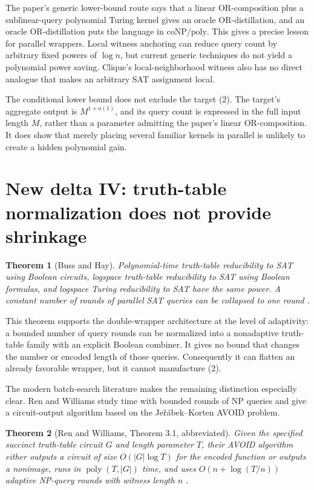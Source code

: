 \documentclass[11pt]{article}
\newtheorem{theorem}{Theorem}
\newcommand{\poly}{\operatorname{poly}}
\begin{document}
The paper's generic lower-bound route says that a linear OR-composition plus
a sublinear-query polynomial Turing kernel gives an oracle
OR-distillation, and an oracle OR-distillation puts the language in
$\mathrm{coNP/poly}$.  This gives a precise lesson for parallel wrappers.
Local witness anchoring can reduce query count by arbitrary fixed powers of
$\log n$, but current generic techniques do not yield a polynomial power
saving.  Clique's local-neighborhood witness also has no direct analogue
that makes an arbitrary SAT assignment local.

The conditional lower bound does not exclude the target (2).  The target's
aggregate output is $M^{1+o(1)}$, and its query count is expressed in the
full input length $M$, rather than a parameter admitting the paper's linear
OR-composition.  It does show that merely placing several familiar kernels
in parallel is unlikely to create a hidden polynomial gain.

\section{New delta IV: truth-table normalization does not provide shrinkage}

\begin{theorem}[Buss and Hay]
Polynomial-time truth-table reducibility to SAT using Boolean circuits,
logspace truth-table reducibility to SAT using Boolean formulas, and
logspace Turing reducibility to SAT have the same power.  A constant number
of rounds of parallel SAT queries can be collapsed to one round
\cite{busshay1991}.
\end{theorem}

This theorem supports the double-wrapper architecture at the level of
adaptivity: a bounded number of query rounds can be normalized into a
nonadaptive truth-table family with an explicit Boolean combiner.  It gives
no bound that changes the number or encoded length of those queries.
Consequently it can flatten an already favorable wrapper, but it cannot
manufacture (2).

The modern batch-search literature makes the remaining distinction
especially clear.  Ren and Williams study time with bounded rounds of NP
queries and give a circuit-output algorithm based on the
Je\v{r}\'abek--Korten AVOID problem.

\begin{theorem}[Ren and Williams, Theorem 3.1, abbreviated]
Given the specified succinct truth-table circuit $G$ and length parameter
$T$, their AVOID algorithm either outputs a circuit of size
$O(|G|\log T)$ for the encoded function or outputs a nonimage, runs in
$\poly(T,|G|)$ time, and uses $O(n+\log(T/n))$ adaptive NP-query rounds with
witness length $n$ \cite{renwilliams2026}.
\end{theorem}
\end{document}
